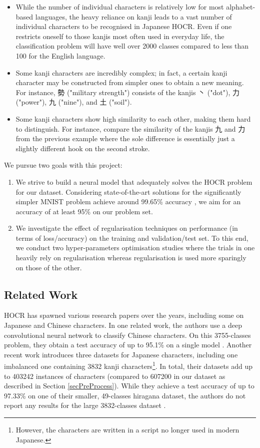 \documentclass[british,12p]{article}
\begin{document}
    \begin{itemize}
    	\item While the number of individual characters is relatively low for most alphabet-based languages, the heavy reliance on kanji leads to a vast number of individual characters to be recognised in Japanese HOCR. Even if one restricts oneself to those kanjis most often used in everyday life, the classification problem will have well over 2000 classes compared to less than 100 for the English language.
    	\item Some kanji characters are incredibly complex; in fact, a certain kanji character may be constructed from simpler ones to obtain a new meaning.  For instance, 勢 ("military strength") consists of the kanjis 丶 ("dot"), 力 ("power"), 九 ("nine"), and 土 ("soil").
       	\item Some kanji characters show high similarity to each other, making them hard to distinguish. For instance, compare the similarity of the kanjis 九 and 力 from the previous example where the sole difference is essentially just a slightly different hook on the second stroke.	
    \end{itemize}

	We pursue two goals with this project:
	\begin{enumerate}
		\item We strive to build a neural model that adequately solves the HOCR problem for our dataset. Considering state-of-the-art solutions for the significantly simpler MNIST problem achieve around 99.65\% accuracy \cite{deepai:19}, we aim for an accuracy of at least 95\% on our problem set. 
		\item We investigate the effect of regularisation techniques on performance (in terms of loss/accuracy) on the training and validation/test set. To this end, we conduct two hyper-parameters optimisation studies where the trials in one heavily rely on regularisation whereas regularisation is used more sparingly on those of the other.
	\end{enumerate}
	
	\subsection{Related Work}
	
	HOCR has spawned various research papers over the years, including some on Japanese and Chinese characters. In one related work, the authors use a deep convolutional neural network to classify Chinese characters. On this 3755-classes problem, they obtain a test accuracy of up to 95.1\% on a single model \cite{zhang:15}. Another recent work introduces three datasets for Japanese characters, including one imbalanced one containing 3832 kanji characters\footnote{However, the characters are written in a script no longer used in modern Japanese.}. In total, their datasets add up to 403242 instances of characters (compared to 607200 in our dataset as described in Section \ref{secPreProcess}). While they achieve a test accuracy of up to 97.33\% on one of their smaller, 49-classes hiragana dataset, the authors do not report any results for the large 3832-classes dataset \cite{lamb:18}. 
\end{document}
